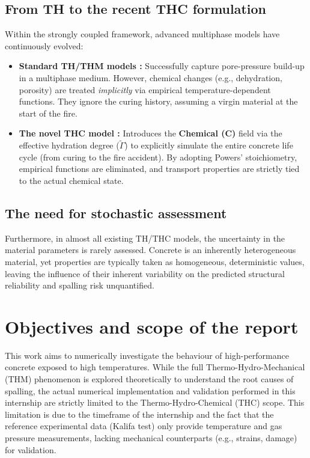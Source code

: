 \subsection{From TH to the recent THC formulation}
Within the strongly coupled framework, advanced multiphase models have continuously evolved:
\begin{itemize}
    \item \textbf{Standard TH/THM models \cite{dauti2018}:} Successfully capture pore-pressure build-up in a multiphase medium. However, chemical changes (e.g., dehydration, porosity) are treated \emph{implicitly} via empirical temperature-dependent functions. They ignore the curing history, assuming a virgin material at the start of the fire.
    \item \textbf{The novel THC model \cite{sciume2024}:} Introduces the \textbf{Chemical (C)} field via the effective hydration degree ($\tilde{\Gamma}$) to explicitly simulate the entire concrete life cycle (from curing to the fire accident). By adopting Powers' stoichiometry, empirical functions are eliminated, and transport properties are strictly tied to the actual chemical state.
\end{itemize}

\subsection{The need for stochastic assessment}
Furthermore, in almost all existing TH/THC models, the uncertainty in the material parameters is rarely assessed. Concrete is an inherently heterogeneous material, yet properties are typically taken as homogeneous, deterministic values, leaving the influence of their inherent variability on the predicted structural reliability and spalling risk unquantified.

\section{Objectives and scope of the report}
This work aims to numerically investigate the behaviour of high-performance concrete exposed to high temperatures. While the full Thermo-Hydro-Mechanical (THM) phenomenon is explored theoretically to understand the root causes of spalling, the actual numerical implementation and validation performed in this internship are strictly limited to the Thermo-Hydro-Chemical (THC) scope. This limitation is due to the timeframe of the internship and the fact that the reference experimental data (Kalifa test) only provide temperature and gas pressure measurements, lacking mechanical counterparts (e.g., strains, damage) for validation.

